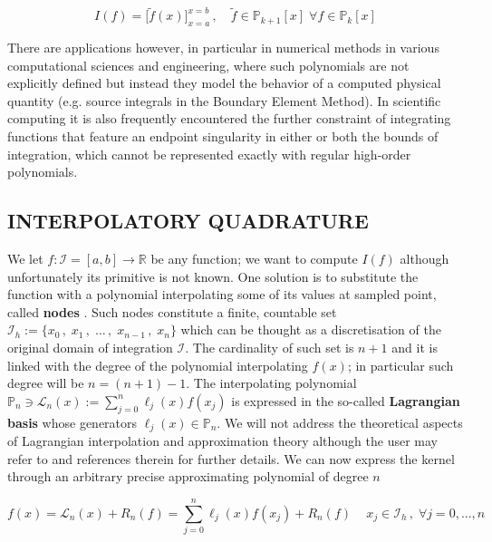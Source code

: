 \documentclass[a4paper, twosided]{book}
\begin{document}
\begin{equation}\label{eq1.2}
    I(f) = \Big[\tilde{f}(x)\Big]_{x=a}^{x=b}\,,\quad\tilde{f}\in\mathbb{P}_{k+1}[x]\;\forall f\in\mathbb{P}_k[x]
\end{equation}

\noindent
There are applications however, in particular in numerical methods in various computational sciences and engineering, where such polynomials are not explicitly defined but instead they model the behavior of a computed physical quantity (e.g. source integrals in the Boundary Element Method). In scientific computing it is also frequently encountered the further constraint of integrating functions that feature an endpoint singularity in either or both the bounds of integration, which cannot be represented exactly with regular high-order polynomials.

\subsection[Interpolatory quadrature]{\changefont INTERPOLATORY QUADRATURE}\label{SubSec1.2.1}

We let $f:\mathcal{I}=[a,b]\to\mathbb{R}$ be any function; we want to compute $I(f)$ although unfortunately its primitive is not known. One solution is to substitute the function with a polynomial interpolating some of its values at sampled point, called \color{poliDarkBlue} \textbf{nodes} \color{black}. Such nodes constitute a finite, countable set $\mathcal{I}_h:=\{x_0\,,\;x_1\,,\;\dots\,,\;x_{n-1}\,,\;x_n\}$ which can be thought as a discretisation of the original domain of integration $\mathcal{I}$. The cardinality of such set is $n+1$ and it is linked with the degree of the polynomial interpolating $f(x)$; in particular such degree will be $n=(n+1)-1$. The interpolating polynomial $\mathbb{P}_n\ni\mathcal{L}_n(x):=\sum_{j=0}^{n}\ell_j(x)f(x_j)$ is expressed in the so-called \color{poliDarkBlue} \textbf{Lagrangian basis} \color{black} whose generators $\ell_j(x)\in\mathbb{P}_n$. We will not address the theoretical aspects of Lagrangian interpolation and approximation theory although the user may refer to \cite{Lombardi21} and references therein for further details. We can now express the kernel through an arbitrary precise approximating polynomial of degree $n$

\begin{equation}\label{eq1.3}
    f(x) = \mathcal{L}_n(x) + R_n(f) = \sum_{j=0}^{n}\ell_j(x)f(x_j) + R_n(f)\,\quad x_j\in\mathcal{I}_h\,,\;\forall j=0,...,n
\end{equation}
\end{document}
